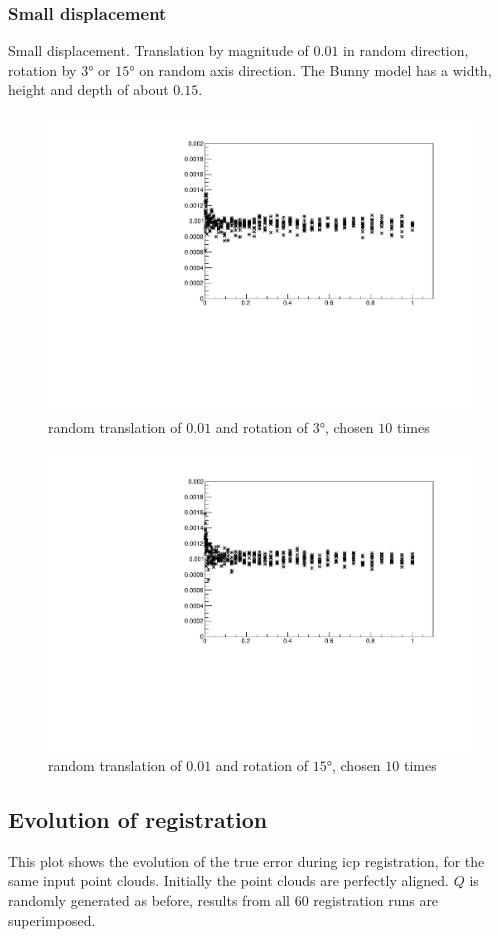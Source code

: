 \subsubsection{Small displacement}
Small displacement. Translation by magnitude of $0.01$ in random direction, rotation by $3 \si{\degree}$ or $15 \si{\degree}$ on random axis direction. The Bunny model has a width, height and depth of about $0.15$.

\begin{figure}[H]
\centering
\includegraphics[width=.7\textwidth]{fig/bunny_globsmall.pdf}
\caption{random translation of $0.01$ and rotation of $3 \si{\degree}$, chosen $10$ times}
\label{fig:bunny_globsmall}
\end{figure}

\begin{figure}[H]
\centering
\includegraphics[width=.7\textwidth]{fig/bunny_globmed.pdf}
\caption{random translation of $0.01$ and rotation of $15 \si{\degree}$, chosen $10$ times}
\label{fig:bunny_globmed}
\end{figure}


\subsection{Evolution of registration}
This plot shows the evolution of the true error during \gls{icp} registration, for the same input point clouds. Initially the point clouds are perfectly aligned. $Q$ is randomly generated as before, results from all $60$ registration runs are superimposed.

